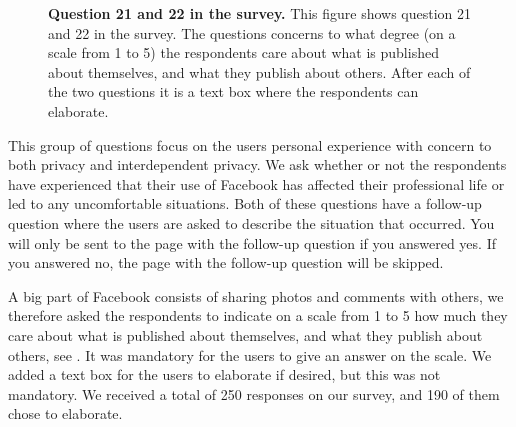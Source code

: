 \begin{figure}[h!]
\centering
{}
\caption[Question 21 and 22 in the survey]{\textbf{Question 21 and 22 in the survey.} This figure shows question 21 and 22 in the survey. The questions concerns to what degree (on a scale from 1 to 5) the respondents care about what is published about themselves, and what they publish about others. After each of the two questions it is a text box where the respondents can elaborate.} 
\label{fig:page12}
\end{figure}

This group of questions focus on the users personal experience with concern to both privacy and interdependent privacy. We ask whether or not the respondents have experienced that their use of Facebook has affected their professional life or led to any uncomfortable situations. Both of these questions have a follow-up question where the users are asked to describe the situation that occurred. You will only be sent to the page with the follow-up question if you answered yes. If you answered no, the page with the follow-up question will be skipped. 

A big part of Facebook consists of sharing photos and comments with others, we therefore asked the respondents to indicate on a scale from 1 to 5 how much they care about what is published about themselves, and what they publish about others, see . It was mandatory for the users to give an answer on the scale. We added a text box for the users to elaborate if desired, but this was not mandatory. We received a total of 250 responses on our survey, and 190 of them chose to elaborate. 

